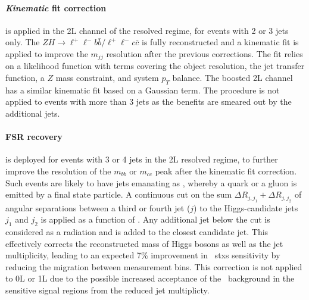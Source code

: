 \paragraph{\textit{Kinematic} fit correction} is applied in the 2L channel of the resolved regime, for events with 2 or 3 jets only. The $ZH \rightarrow \ell^+\ell^- b\bar{b} / \ell^+\ell^- c\bar{c}$ is fully reconstructed and a kinematic fit is applied to improve the $m_{jj}$ resolution after the previous corrections. The fit relies on a likelihood function with terms covering the object resolution, the jet transfer function, a $Z$ mass constraint, and system $p_T$ balance. The boosted 2L channel has a similar kinematic fit based on a Gaussian term. The procedure is not applied to events with more than 3 jets as the benefits are smeared out by the additional jets. %

\paragraph{FSR recovery} is deployed for events with 3 or 4 jets in the 2L resolved regime, to further improve the resolution of the $m_{bb}$ or $m_{cc}$ peak after the kinematic fit correction. Such events are likely to have jets emanating as , whereby a quark or a gluon is emitted by a final state particle. A continuous cut on the sum $\Delta R_{j, j_1} + \Delta R_{j, j_2}$ of angular separations between a third or fourth jet ($j$) to the Higgs-candidate jets $j_1$ and $j_2$ is applied as a function of \ptv. Any additional jet below the cut is considered as a radiation and is added to the closest candidate jet. This effectively corrects the reconstructed mass of Higgs bosons as well as the jet multiplicity, leading to an expected 7\% improvement in \vhb\ \gls{stxs} sensitivity by reducing the migration between measurement bins. This correction is not applied to 0L or 1L due to the possible increased acceptance of the \ttb\ background in the sensitive signal regions from the reduced jet multiplicty.